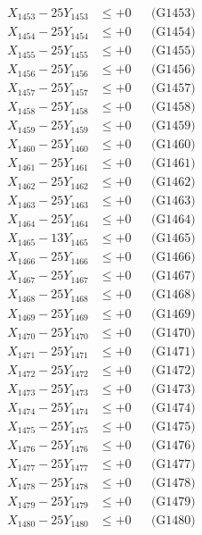 \documentclass[a4paper,10pt]{article}
\begin{document}
{\begin{align}
X_{1453} - 25Y_{1453} &\leq +0 && \text{(G1453)} \\
X_{1454} - 25Y_{1454} &\leq +0 && \text{(G1454)} \\
X_{1455} - 25Y_{1455} &\leq +0 && \text{(G1455)} \\
X_{1456} - 25Y_{1456} &\leq +0 && \text{(G1456)} \\
X_{1457} - 25Y_{1457} &\leq +0 && \text{(G1457)} \\
X_{1458} - 25Y_{1458} &\leq +0 && \text{(G1458)} \\
X_{1459} - 25Y_{1459} &\leq +0 && \text{(G1459)} \\
X_{1460} - 25Y_{1460} &\leq +0 && \text{(G1460)} \\
\allowbreak
X_{1461} - 25Y_{1461} &\leq +0 && \text{(G1461)} \\
X_{1462} - 25Y_{1462} &\leq +0 && \text{(G1462)} \\
X_{1463} - 25Y_{1463} &\leq +0 && \text{(G1463)} \\
X_{1464} - 25Y_{1464} &\leq +0 && \text{(G1464)} \\
X_{1465} - 13Y_{1465} &\leq +0 && \text{(G1465)} \\
X_{1466} - 25Y_{1466} &\leq +0 && \text{(G1466)} \\
X_{1467} - 25Y_{1467} &\leq +0 && \text{(G1467)} \\
X_{1468} - 25Y_{1468} &\leq +0 && \text{(G1468)} \\
X_{1469} - 25Y_{1469} &\leq +0 && \text{(G1469)} \\
X_{1470} - 25Y_{1470} &\leq +0 && \text{(G1470)} \\
\allowbreak
X_{1471} - 25Y_{1471} &\leq +0 && \text{(G1471)} \\
X_{1472} - 25Y_{1472} &\leq +0 && \text{(G1472)} \\
X_{1473} - 25Y_{1473} &\leq +0 && \text{(G1473)} \\
X_{1474} - 25Y_{1474} &\leq +0 && \text{(G1474)} \\
X_{1475} - 25Y_{1475} &\leq +0 && \text{(G1475)} \\
X_{1476} - 25Y_{1476} &\leq +0 && \text{(G1476)} \\
X_{1477} - 25Y_{1477} &\leq +0 && \text{(G1477)} \\
X_{1478} - 25Y_{1478} &\leq +0 && \text{(G1478)} \\
X_{1479} - 25Y_{1479} &\leq +0 && \text{(G1479)} \\
X_{1480} - 25Y_{1480} &\leq +0 && \text{(G1480)} \\

\end{align}}
\end{document}
